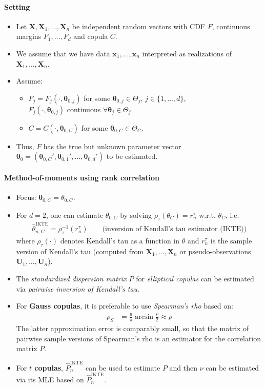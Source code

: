 \documentclass[a4paper,landscape,8pt,fleqn]{scrartcl}
\renewcommand{\emph}[1]{\textbf{#1}}
\begin{document}
\begin{multicols*}{3}
\paragraph{Setting}
\begin{itemize}
\item Let $\bm X, \bm X_1, \ldots, \bm X_n$ be independent random vectors with CDF $F$, continuous margins $F_1, \ldots, F_d$ and copula $C$.
\item We assume that we have data $\bm x_1, \ldots, \bm x_n$ interpreted as realizations of $\bm X_1, \ldots, \bm X_n$.
\item Assume:
\begin{itemize}
\item $F_j = F_j(\cdot, \bm \theta_{0,j})$ for some $\bm \theta_{0,j} \in \Theta_j$, $j \in \lbrace 1, \ldots, d \rbrace$, \\
$F_j(\cdot, \bm \theta_{0,j})$ continuous $\forall \bm \theta_j \in \Theta_j$.
\item $C = C(\cdot, \bm \theta_{0,C})$ for some $\bm \theta_{0,C} \in \Theta_C$.
\end{itemize}
\item Thus, $F$ has the true but unknown parameter vector $\bm \theta_0 = (\bm \theta_{0,C}', \bm \theta_{0,1}', \ldots, \bm \theta_{0,d}')$ to be estimated.
\end{itemize}

\paragraph{Method-of-moments using rank correlation}
\begin{itemize}
\item Focus: $\bm \theta_{0,C} = \theta_{0,C}$.
\item For $d=2$, one can estimate $\theta_{0,C}$ by solving $\rho_\tau(\theta_C) = r_n^\tau$ w.r.t. $\theta_C$, i.e.
\begin{align*}
\hat \theta_{n,C}^\text{IKTE} = \rho_\tau^{-1}(r_n^\tau) \qquad \text{(inversion of Kendall's tau estimator (IKTE))}
\end{align*}
where $\rho_\tau(\cdot)$ denotes Kendall's tau as a function in $\theta$ and $r_n^\tau$ is the sample version of Kendall's tau (computed from $\bm X_1, \ldots, \bm X_n$ or pseudo-observations $\bm U_1, \ldots, \bm U_n$).
\item The \textit{standardized dispersion matrix $P$} for \textit{elliptical copulas} can be estimated via \textit{pairwise inversion of Kendall's tau}.
\item For \emph{Gauss copulas}, it is preferable to use \textit{Spearman's rho} based on:
\begin{align*}
\rho_S &= \frac{6}{\pi} \arcsin \frac{\rho}{2} \approx \rho
\end{align*}
The latter approximation error is comparably small, so that the matrix of pairwise sample versions of Spearman's rho is an estimator for the correlation matrix $P$.
\item For \emph{$t$ copulas}, $\hat P_n^\text{IKTE}$ can be used to estimate $P$ and then $\nu$ can be estimated via its MLE based on $\hat P_n^\text{IKTE}$.
\end{itemize}


\end{multicols*}
\end{document}
